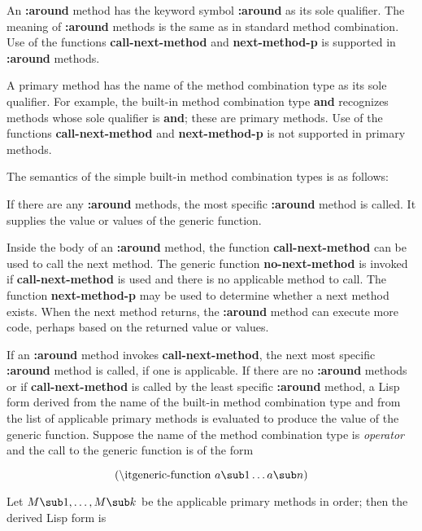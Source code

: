 \beginlist

\item{\bull} An {\bf :around} method has the keyword symbol {\bf
:around} as its sole qualifier.  The meaning of {\bf :around}
methods is the same as in standard method combination.  Use of the
functions {\bf call-next-method} and {\bf next-method-p} is supported
in {\bf :around} methods.

\item{\bull} A primary method has the name of the method combination
type as its sole qualifier.  For example, the built-in method
combination type {\bf and} recognizes methods whose sole qualifier is
{\bf and}; these are primary methods. Use of the functions {\bf
call-next-method} and {\bf next-method-p} is not supported in primary
methods.

\endlist

The semantics of the simple built-in method combination types is as
follows:

\beginlist
\item{\bull}
If there are any {\bf :around} methods, the most specific {\bf :around}
method is called.   It supplies the value or values of the generic function. 

\item{\bull} Inside the body of an {\bf :around} method, the function
{\bf call-next-method} can be used to call the next method.  The
generic function {\bf no-next-method} is invoked if {\bf
call-next-method} is used and there is no applicable method to call.
The function {\bf next-method-p} may be used to determine whether a
next method exists. When the next method returns, the {\bf :around}
method can execute more code, perhaps based on the returned value or
values.

\item{\bull} If an {\bf :around} method invokes {\bf
call-next-method}, the next most specific {\bf :around} method is
called, if one is applicable.  If there are no {\bf :around} methods
or if {\bf call-next-method} is called by the least specific {\bf
:around} method, a Lisp form derived from the name of the built-in
method combination type and from the list of applicable primary
methods is evaluated to produce the value of the generic function.
Suppose the name of the method combination type is {\it operator\/}
and the call to the generic function is of the form

$$(\hbox{{\it generic-function}}\ a\sub 1\ldots a\sub n)$$

\item{} Let $M\sub 1,\ldots,M\sub k$ be the applicable primary methods
in order; then the derived Lisp form is

